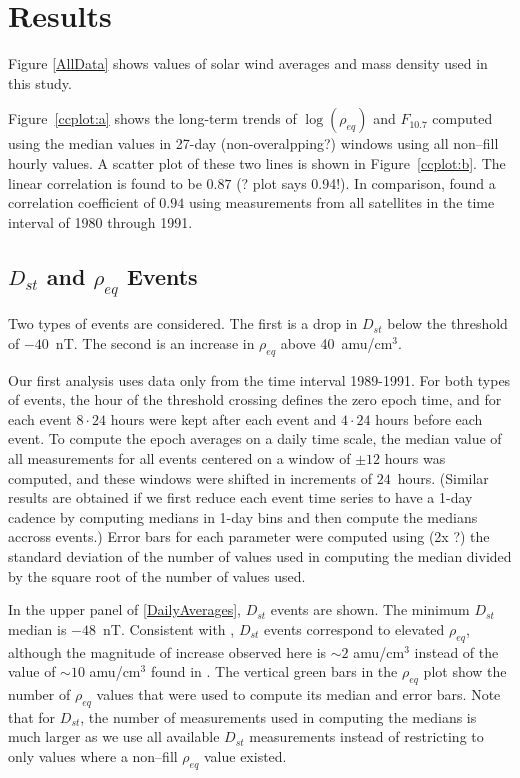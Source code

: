 \documentclass[10pt,twocolumn]{article}
\begin{document}

\section{Results}
Figure \ref{AllData} shows values of solar wind averages and mass density used in this study.  

Figure~\ref{ccplot:a} shows the long-term trends of $\log(\rho_{eq})$ and $F_{10.7}$ computed using the median values in 27-day (non-overalpping?) windows using all non--fill hourly values.  A scatter plot of these two lines is shown in Figure~\ref{ccplot:b}.  The linear correlation is found to be $0.87$ (? plot says 0.94!).  In comparison, \cite{Takahashi2010} found a correlation coefficient of $0.94$ using measurements from all satellites in the time interval of 1980 through 1991.

\subsection{$D_{st}$ and $\rho_{eq}$ Events}

Two types of events are considered. The first is a drop in $D_{st}$ below the threshold of $-40$~nT.  The second is an increase in $\rho_{eq}$ above 40~amu/cm$^3$.

Our first analysis uses data only from the time interval 1989-1991. For both types of events, the hour of the threshold crossing defines the zero epoch time, and for each event $8\cdot24$ hours were kept after each event and $4\cdot24$ hours before each event.  To compute the epoch averages on a daily time scale, the median value of all measurements for all events centered on a window of $\pm 12$ hours was computed, and these windows were shifted in increments of $24$~hours. (Similar results are obtained if we first reduce each event time series to have a 1-day cadence by computing medians in 1-day bins and then compute the medians accross events.)  Error bars for each parameter were computed using (2x ?) the standard deviation of the number of values used in computing the median divided by the square root of the number of values used.

In the upper panel of \ref{DailyAverages}, $D_{st}$ events are shown.  The minimum $D_{st}$ median is $-48$~nT.  Consistent with \cite{Takahashi2010}, $D_{st}$ events correspond to elevated $\rho_{eq}$, although the magnitude of increase observed here is $\sim 2$ amu/cm$^3$ instead of the value of $\sim 10$ amu/cm$^3$ found in \cite{Takahashi2010}.  The vertical green bars in the $\rho_{eq}$ plot show the number of $\rho_{eq}$ values that were used to compute its median and error bars.  Note that for $D_{st}$, the number of measurements used in computing the medians is much larger as we use all available $D_{st}$ measurements instead of restricting to only values where a non--fill $\rho_{eq}$ value existed.  
\end{document}
